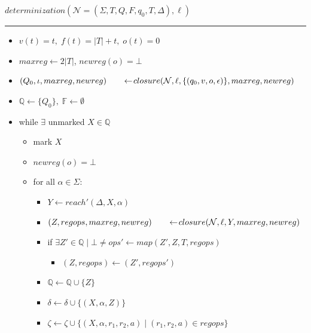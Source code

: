 \documentclass{article}
\newcommand{\Xset}{\!\leftarrow\!}
\newcommand{\Xin}{\!\in\!}
\newcommand{\Xeq}{\!=\!}
\newcommand{\XN}{\mathcal{N}}
\newcommand{\YF}{\mathbb{F}}
\newcommand{\YQ}{\mathbb{Q}}
\theoremstyle{definition}
\begin{document}
\begin{multicols}{2}

    $determinization(\XN \Xeq (\Sigma, T, Q, F, q_0, T, \Delta), \ell)$
    \hrule
    \begin{itemize}[leftmargin=0in]
        \smallskip
        \item[] $v(t) \Xeq t,
            \; f(t) \Xeq |T| \!+\! t,
            \; o(t) \Xeq 0$
        \item[] $maxreg \Xset 2|T|$, $newreg(o) \Xeq \bot$
        \item[] $(Q_0, \iota, maxreg, newreg) \\
            \hphantom{\hspace{2em}} \Xset closure(\XN, \ell, \{(q_0, v, o, \epsilon)\}, maxreg, newreg)$
        \item[] $\YQ \Xset \{ Q_0 \}, \; \YF \Xset \emptyset$
        \smallskip
        \item[] while $\exists$ unmarked $X \Xin \YQ$
        \begin{itemize}
            \item[] mark $X$
            \smallskip
            \item[] $newreg(o) \Xeq \bot$
            \item[] for all $\alpha \in \Sigma$:
            \begin{itemize}
                \item[] $Y \Xset reach'(\Delta, X, \alpha)$
                \item[] $(Z, regops, maxreg, newreg) \\
                    \hphantom{\hspace{2em}} \Xset closure(\XN, \ell, Y, maxreg, newreg)$
                \item[] if $\exists Z' \Xin \YQ \mid \bot\!\neq\!ops' \Xset map(Z', Z, T, regops)$
                \begin{itemize}
                    \item[] $(Z, regops) \Xset (Z', regops')$
                \end{itemize}
                \item[] $\YQ \Xset \YQ \cup \{ Z \}$
                \item[] $\delta \Xset \delta \cup \{(X, \alpha, Z)\}$
                \item[] $\zeta \Xset \zeta \cup \{(X, \alpha, r_1, r_2, a) \mid (r_1, r_2, a) \Xin regops \}$

\end{itemize}
\end{itemize}
\end{itemize}
\end{multicols}
\end{document}
